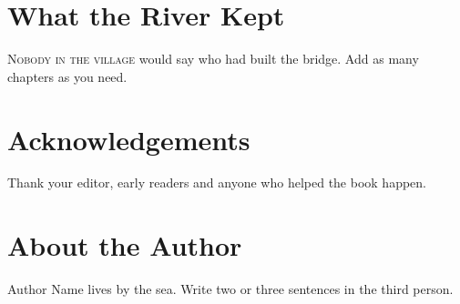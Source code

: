 \documentclass[11pt,openany]{book}
\newcommand{\opening}[1]{\noindent\textsc{#1}}
\begin{document}
\chapter{What the River Kept}
\opening{Nobody in the village} would say who had built the bridge. Add as many chapters as you need.

\backmatter
\chapter*{Acknowledgements}
Thank your editor, early readers and anyone who helped the book happen.

\chapter*{About the Author}
Author Name lives by the sea. Write two or three sentences in the third person.
\end{document}
